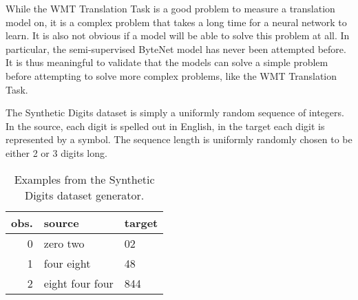 While the WMT Translation Task is a good problem to measure a translation model on, it is a complex problem that takes a long time for a neural network to learn. It is also not obvious if a model will be able to solve this problem at all. In particular, the semi-supervised ByteNet model has never been attempted before. It is thus meaningful to validate that the models can solve a simple problem before attempting to solve more complex problems, like the WMT Translation Task.

The Synthetic Digits dataset is simply a uniformly random sequence of integers. In the source, each digit is spelled out in English, in the target each digit is represented by a symbol. The sequence length is uniformly randomly chosen to be either 2 or 3 digits long.

\begin{table}[H]
\centering
\begin{tabular}{r|p{5cm} p{5cm}}
	obs. & source & target\\ \hline
	0 & zero two & 02 \\
    1 & four eight & 48 \\
    2 & eight four four & 844
\end{tabular}
\caption{Examples from the Synthetic Digits dataset generator.}
\end{table}
